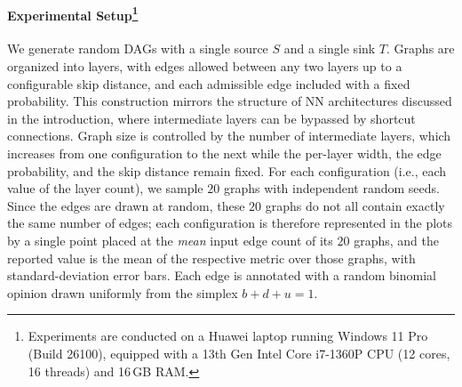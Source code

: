 \paragraph{Experimental Setup\protect\footnote{Experiments are conducted on a Huawei laptop running Windows 11 Pro (Build 26100), equipped with a 13th Gen Intel Core i7-1360P CPU (12 cores, 16 threads) and 16\,GB RAM.}}
We generate random \acp{DAG} with a single source $S$ and a single sink $T$. Graphs are organized into layers, with edges allowed between any two layers up to a configurable skip distance, and each admissible edge included with a fixed probability. This construction mirrors the structure of \ac{NN} architectures discussed in the introduction, where intermediate layers can be bypassed by shortcut connections. Graph size is controlled by the number of intermediate layers, which increases from one configuration to the next while the per-layer width, the edge probability, and the skip distance remain fixed. For each configuration (i.e., each value of the layer count), we sample $20$ graphs with independent random seeds. Since the edges are drawn at random, these $20$ graphs do not all contain exactly the same number of edges; each configuration is therefore represented in the plots by a single point placed at the \emph{mean} input edge count of its $20$ graphs, and the reported value is the mean of the respective metric over those graphs, with standard-deviation error bars. Each edge is annotated with a random binomial opinion drawn uniformly from the simplex $b+d+u=1$.

